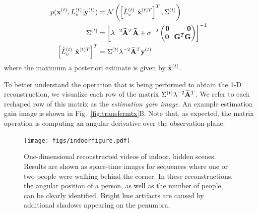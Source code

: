 \begin{align}
\notag p(\xt, L_v^{(t)} |\yt) & = \mathcal{N} \left( \left[ \hat{L}_v^{(t)} \hspace{0.05in} {\hat{\mathbf{x}}}^{(t)T} \right]^T , \Sigma^{(t)} \right) \\
\notag \Sigma^{(t)} &= \left[\lambda^{-2}\widetilde{\A}^T\widetilde{\A} + \sigma^{-2} \Spvek{ \mathbf{0} \hspace{0.35in} \mathbf{0} ; \mathbf{0} \hspace{0.1in} \G^T\G } \right]^{-1} \\
\left[ \hat{L}_v^{(t)} \hspace{0.05in} {\hat{\mathbf{x}}}^{(t)T} \right]^T &= \Sigma^{(t)}
            \lambda^{-2}\widetilde{\A}^T\yt  
\end{align}
where the maximum a posteriori estimate is  given by $\hat{\bf{x}}^{(t)}$.

To better understand the operation that is being performed to obtain the 1-D reconstruction, we visualize each row of the matrix $\Sigma^{(t)}\lambda^{-2}\widetilde{\mathbf{A}}^T $. We refer to each reshaped row of this matrix as the {\it estimation gain image}. An example estimation gain image is shown in Fig.~\ref{fig:transfermtx}B. Note that, as expected, the matrix operation is computing an angular derivative over the observation plane. 

\begin{figure}[tb]
\centering
\texttt{[image: figs/indoorfigure.pdf]}
\vspace{-1in}
\caption{\label{fig:indoorfigure} One-dimensional reconstructed videos of indoor, hidden scenes. Results are shown as space-time images for sequences where one or two people were walking behind the corner. In these reconstructions, the angular position of a person, as well as the number of people, can be clearly identified. Bright line artifacts are caused by additional shadows appearing on the penumbra.
}
\vspace{-.2in}
\end{figure}

